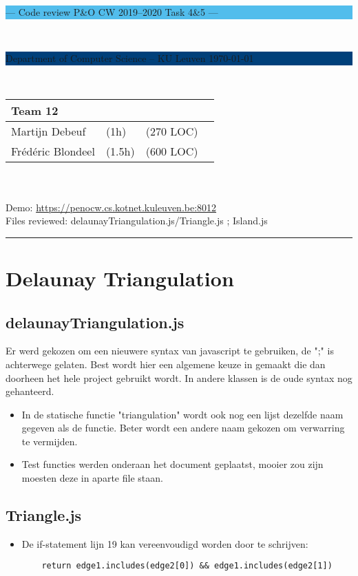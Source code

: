 \documentclass[a4paper,11pt]{article}
\begin{document}
\noindent
\colorbox[HTML]{52BDEC}{\bfseries\parbox{\textwidth}{\centering\large
  --- Code review P\&O CW 2019--2020 Task 4\&5 ---
}}
\\[-1mm]
\colorbox[HTML]{00407A}{\bfseries\color{white}\parbox{\textwidth}{
  Department of Computer Science -- KU Leuven
  \hfill
  \today
}}
\\

\smallskip

\noindent
\begin{tabular}{*4l}
\toprule
\multicolumn{3}{l}{\large\textbf{Team 12}} \\
\midrule
Martijn Debeuf & (1h) & (270 LOC) \\ %
Frédéric Blondeel & (1.5h) & (600 LOC) \\
\bottomrule
\hline
\end{tabular}\\
\\
Demo: \url{https://penocw.cs.kotnet.kuleuven.be:8012} \\
Files reviewed: delaunayTriangulation.js/Triangle.js ; Island.js

\noindent
{\color[HTML]{52BDEC} \rule{\linewidth}{1mm} }

\smallskip

\section{Delaunay Triangulation}
\subsection{delaunayTriangulation.js}
Er werd gekozen om een nieuwere syntax van javascript te gebruiken, de ";" is achterwege gelaten. 
Best wordt hier een algemene keuze in gemaakt die dan doorheen het hele project gebruikt wordt. In andere klassen 
is de oude syntax nog gehanteerd.
\begin{itemize}
\item In de statische functie "triangulation" wordt ook nog een lijst dezelfde naam gegeven als de functie. Beter wordt een andere naam gekozen om verwarring te vermijden.
\item Test functies werden onderaan het document geplaatst, mooier zou zijn moesten deze in aparte file staan.
\end{itemize}

\subsection{Triangle.js}
\begin{itemize}
	\item De if-statement lijn 19 kan vereenvoudigd worden door te schrijven:
	\begin{verbatim}
	return edge1.includes(edge2[0]) && edge1.includes(edge2[1])
	\end{verbatim}
\end{itemize}
\end{document}

